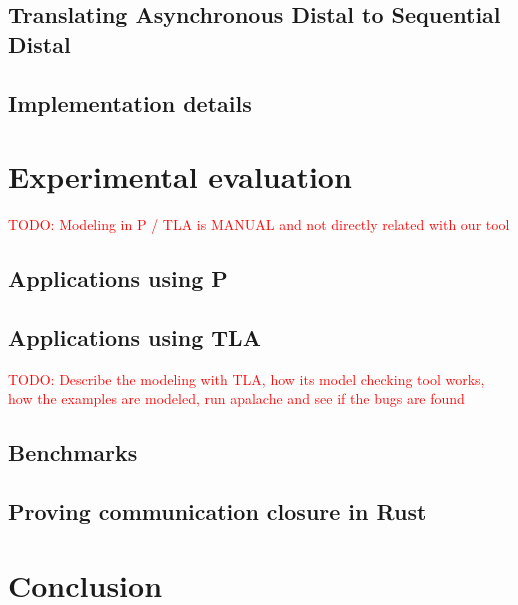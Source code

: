 \documentclass[11pt]{report}
\theoremstyle{plain}
\theoremstyle{definition}
\newcommand{\todo}[1]{\textcolor{red}{TODO: #1}}
\begin{document}
    \section{Translating Asynchronous Distal to Sequential Distal}
    \label{tool:translateasynctosync}
    
    \section{Implementation details}
    
\chapter{Experimental evaluation}
    \todo{Modeling in P / TLA is MANUAL and not directly related with our tool}

    \section{Applications using P}

    \section{Applications using TLA}
    \todo{Describe the modeling with TLA, how its model checking tool works, how the examples are modeled, run apalache and see if the bugs are found}

    \section{Benchmarks}

    \section{Proving communication closure in Rust}
    \label{rustcommclosure}

\chapter{Conclusion}
\label{conclusion}


\printbibliography
\end{document}
